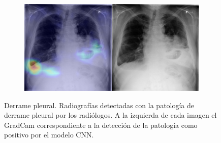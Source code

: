 \begin{figure}[b]
\begin{subfigure}{0.4\textwidth}
    \end{subfigure}
    \begin{subfigure}{0.4\textwidth}
        \centering
        \includegraphics[width=1.0\textwidth]{Chapters/5. Conclusiones/img/Effusion/1_1_00022899_009.png}
    \end{subfigure}

    \caption{Derrame pleural. Radiografías detectadas con la patología de derrame pleural por los
                    radiólogos. A la izquierda de cada imagen el GradCam correspondiente a la detección
                    de la patología como positivo por el modelo CNN.}
\end{figure}

